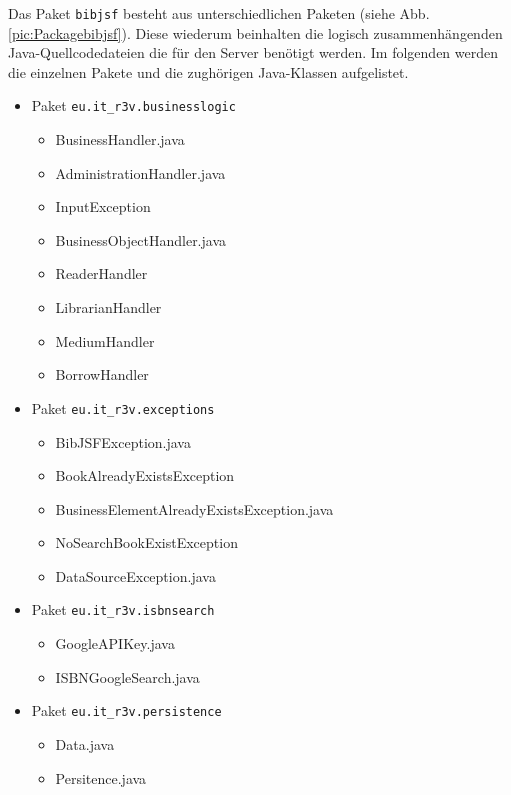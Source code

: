 \documentclass[fontsize=12pt,paper=a4,twoside]{scrartcl}
\begin{document}
Das Paket \texttt{bibjsf} besteht aus unterschiedlichen Paketen (siehe Abb. \vref{pic:Packagebibjsf}). Diese wiederum beinhalten die logisch zusammenhängenden Java-Quellcodedateien die für den Server benötigt werden. Im folgenden werden die einzelnen Pakete und die zughörigen Java-Klassen aufgelistet. 

\begin{itemize}
\item{Paket \texttt{eu.it\_r3v.businesslogic}}

\begin{itemize}
\item{BusinessHandler.java}
\item{AdministrationHandler.java}
\item{InputException}
\item{BusinessObjectHandler.java}
\item{ReaderHandler}
\item{LibrarianHandler}
\item{MediumHandler}
\item{BorrowHandler}
\end{itemize}

\item{Paket \texttt{eu.it\_r3v.exceptions}}

\begin{itemize}
\item{BibJSFException.java}
\item{BookAlreadyExistsException}
\item{BusinessElementAlreadyExistsException.java}
\item{NoSearchBookExistException}
\item{DataSourceException.java}
\end{itemize}

\item{Paket \texttt{eu.it\_r3v.isbnsearch}}

\begin{itemize}
\item{GoogleAPIKey.java}
\item{ISBNGoogleSearch.java}
\end{itemize}

\item{Paket \texttt{eu.it\_r3v.persistence}}
\begin{itemize}
\item{Data.java}
\item{Persitence.java}
\end{itemize}


\end{itemize}
\end{document}
